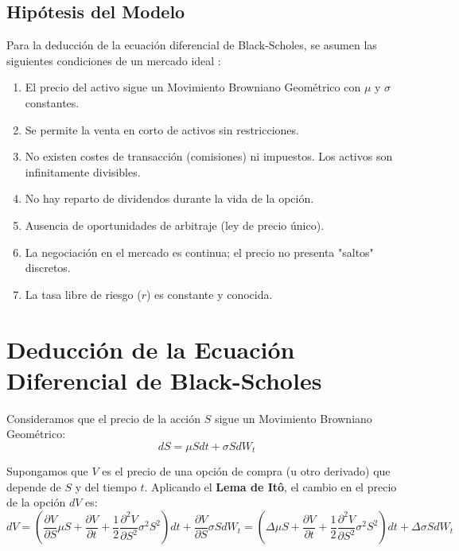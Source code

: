 \documentclass[11pt]{article}
\begin{document}
		\subsection{Hipótesis del Modelo}
			Para la deducción de la ecuación diferencial de Black-Scholes, se asumen las siguientes condiciones de un mercado ideal \cite{hull2016options}:
			\begin{enumerate}
				\item El precio del activo sigue un Movimiento Browniano Geométrico con $\mu$ y $\sigma$ constantes.
				\item Se permite la venta en corto de activos sin restricciones.
				\item No existen costes de transacción (comisiones) ni impuestos. Los activos son infinitamente divisibles.
				\item No hay reparto de dividendos durante la vida de la opción.
				\item Ausencia de oportunidades de arbitraje (ley de precio único).
				\item La negociación en el mercado es continua; el precio no presenta "saltos" discretos.
				\item La tasa libre de riesgo ($r$) es constante y conocida.
			\end{enumerate}
			
	\section{Deducción de la Ecuación Diferencial de Black-Scholes}
	
		Consideramos que el precio de la acción $S$ sigue un Movimiento Browniano Geométrico:
		\begin{equation}
			dS = \mu S dt + \sigma S dW_t
			\label{d S}
		\end{equation}
		
		Supongamos que $V$ es el precio de una opción de compra (u otro derivado) que depende de $S$ y del tiempo $t$. Aplicando el \textbf{Lema de Itô}, el cambio en el precio de la opción $dV$ es:
		\begin{equation}
		dV = \left( \frac{\partial V}{\partial S} \mu S + \frac{\partial V}{\partial t} + \frac{1}{2} \frac{\partial^2 V}{\partial S^2} \sigma^2 S^2 \right) dt + \frac{\partial V}{\partial S} \sigma S dW_t = \left( \Delta\mu S + \frac{\partial V}{\partial t} + \frac{1}{2} \frac{\partial^2 V}{\partial S^2} \sigma^2 S^2 \right) dt + \Delta \sigma S dW_t
		\label{d V}
		\end{equation}
		
\end{document}
